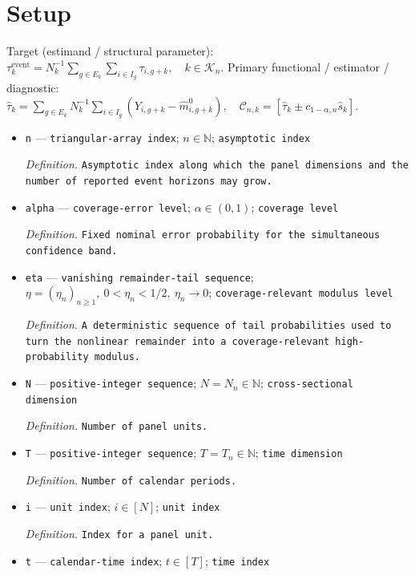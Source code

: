 \documentclass{article}
\begin{document}
\section{Setup}

Target (estimand / structural parameter): \(\tau_k^{\mathrm{event}}=N_k^{-1}\sum_{g\in E_k}\sum_{i\in I_g}\tau_{i,g+k},\quad k\in\mathcal K_n\).
Primary functional / estimator / diagnostic: \(\widehat\tau_k=\sum_{g\in E_k}N_k^{-1}\sum_{i\in I_g}(Y_{i,g+k}-\widehat m^0_{i,g+k}),\quad \mathcal C_{n,k}=[\widehat\tau_k\pm c_{1-\alpha,n}\widehat s_k]\).
\begin{itemize}
  \item \texttt{n} --- \texttt{triangular-\allowbreak{}array index}; \(n\in\mathbb N\); \texttt{asymptotic index}
  \par\smallskip\noindent\emph{Definition.} \texttt{Asymptotic index along which the panel dimensions and the number of reported event horizons may grow.}
  \item \texttt{alpha} --- \texttt{coverage-\allowbreak{}error level}; \(\alpha\in(0,1)\); \texttt{coverage level}
  \par\smallskip\noindent\emph{Definition.} \texttt{Fixed nominal error probability for the simultaneous confidence band.}
  \item \texttt{eta} --- \texttt{vanishing remainder-\allowbreak{}tail sequence}; \(\eta=(\eta_n)_{n\ge1},\ 0<\eta_n<1/2,\ \eta_n\to0\); \texttt{coverage-\allowbreak{}relevant modulus level}
  \par\smallskip\noindent\emph{Definition.} \texttt{A deterministic sequence of tail probabilities used to turn the nonlinear remainder into a coverage-\allowbreak{}relevant high-\allowbreak{}probability modulus.}
  \item \texttt{N} --- \texttt{positive-\allowbreak{}integer sequence}; \(N=N_n\in\mathbb N\); \texttt{cross-\allowbreak{}sectional dimension}
  \par\smallskip\noindent\emph{Definition.} \texttt{Number of panel units.}
  \item \texttt{T} --- \texttt{positive-\allowbreak{}integer sequence}; \(T=T_n\in\mathbb N\); \texttt{time dimension}
  \par\smallskip\noindent\emph{Definition.} \texttt{Number of calendar periods.}
  \item \texttt{i} --- \texttt{unit index}; \(i\in[N]\); \texttt{unit index}
  \par\smallskip\noindent\emph{Definition.} \texttt{Index for a panel unit.}
  \item \texttt{t} --- \texttt{calendar-\allowbreak{}time index}; \(t\in[T]\); \texttt{time index}

\end{itemize}
\end{document}
